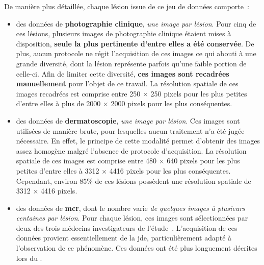 De manière plus détaillée, chaque lésion issue de ce jeu de données comporte~:
\begin{itemize}
    \item des données de \textbf{photographie clinique}, \textit{une image par lésion}. Pour cinq de ces lésions, plusieurs images de photographie clinique étaient mises à disposition, \textbf{seule la plus pertinente d'entre elles a été conservée}. De plus, aucun protocole ne régit l'acquisition de ces images ce qui abouti à une grande diversité, dont la lésion représente parfois qu'une faible portion de celle-ci. Afin de limiter cette diversité, \textbf{ces images sont recadrées manuellement} pour l'objet de ce travail. La résolution spatiale de ces images recadrées est comprise entre 250 $\times$ 250 pixels pour les plus petites d'entre elles à plus de 2000 $\times$ 2000 pixels pour les plus conséquentes.
    \item des données de \textbf{dermatoscopie}, \textit{une image par lésion}. Ces images sont utilisées de manière brute, pour lesquelles aucun traitement n'a été jugée nécessaire. En effet, le principe de cette modalité permet d'obtenir des images assez homogène malgré l'absence de protocole d'acquisition. La résolution spatiale de ces images est comprise entre 480 $\times$ 640 pixels pour les plus petites d'entre elles à 3312 $\times$ 4416 pixels pour les plus conséquentes. Cependant, environ 85\% de ces lésions possèdent une résolution spatiale de 3312 $\times$ 4416 pixels.
    \item des données de \textbf{\gls{mcr}}, dont le nombre varie \textit{de quelques images à plusieurs centaines par lésion}. Pour chaque lésion, ces images sont sélectionnées par deux des trois médecins investigateurs de l'étude~\cite{Cinotti2018}. L'acquisition de ces données provient essentiellement de la \gls{jde}, particulièrement adapté à l'observation de ce phénomène. Ces données ont été plus longuement décrites lors du .
\end{itemize}\par

